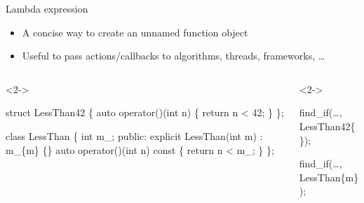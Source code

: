 \begin{frame}[fragile]{Lambda expression}

  \begin{itemize}
  \item A concise way to create an unnamed function object
  \item Useful to pass actions/callbacks to algorithms, threads, frameworks,
    \ldots
  \end{itemize}

  \begin{columns}[t]

    \begin{column}{.5\textwidth}
      \begin{codeblock}<2->{
struct LessThan42 \{
  auto operator()(int n)
  \{
    return n < 42;
  \}
\};

class LessThan \{
  int m\_;
 public:
  explicit LessThan(int m)
    : m\_\{m\} \{\}
  auto operator()(int n) const
  \{
    return n < m_;
  \}
\};}\end{codeblock}

    \end{column}

    \begin{column}{.5\textwidth}
      \begin{codeblock}<2->{
find_if(\ldots, LessThan42\{\});


find_if(\ldots, LessThan\{m\});

}\end{codeblock}
    \end{column}

  \end{columns}
\end{frame}

